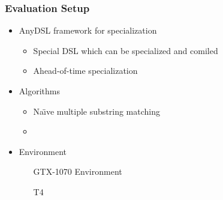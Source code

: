 \documentclass[xcolor=table]{beamer}
\begin{document}
\begin{frame}[fragile] \frametitle{Evaluation Setup}
  \begin{itemize}
    \item AnyDSL framework for specialization
    \begin{itemize}
      \item Special DSL which can be specialized and comiled
      \item Ahead-of-time specialization
    \end{itemize}
    \pause
    \item Algorithms
    \begin{itemize}
      \item Na\"{\i}ve multiple substring matching
      \item
    \end{itemize}
    \pause
    \item Environment
    \begin{itemize}
      \item [GTX-1070] Environment
      \item [T4]
    \end{itemize}

  \end{itemize}
\end{frame}
\end{document}
